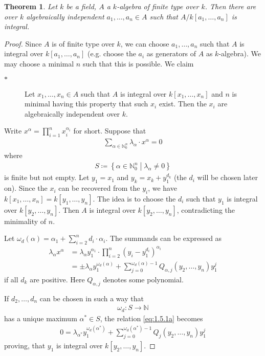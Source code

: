 \documentclass[DIV=14,parskip=half]{scrartcl}
\newtheorem{thm}{Theorem}[subsection]
\theoremstyle{definition}
\newcommand{\N}{\mathbb{N}}
\newcommand{\longto}{\longrightarrow}
\newcommand{\ldotspam}{,\ldots,}
\begin{document}
\begin{thm}\label{thm:NoetherNormalization}
 Let $k$ be a field, $A$ a $k$-algebra of finite type over $k$. Then there are over $k$ algebraically independent $a_1\ldotspam a_n\in A$ such that $A/k[a_1\ldotspam a_n]$ is integral.
\end{thm}
\begin{proof}
 Since $A$ is of finite type over $k$, we can choose $a_1,\ldots, a_n$ such that $A$ is integral over $k[a_1,\ldots, a_n]$ (e.g. choose the $a_i$ as generators of $A$ as $k$-algebra). We may choose a minimal $n$ such that this is possible. We claim 
 \begin{description}
  \item [$\ast$] Let $x_1,\ldots, x_n\in A$ such that $A$ is integral over $k[x_1,\ldots,x_n]$ and $n$ is minimal having this property that such $x_i$ exist. Then the $x_i$ are algebraically independent over $k$.
 \end{description}
Write $x^\alpha = \prod_{i=1}^n x_i^{\alpha_i}$ for short. Suppose that
\begin{align*}
\sum_{\alpha\in\N_0^n} \lambda_\alpha \cdot x^\alpha =0\label{eq:1.5.1a}\tag{\#}
\end{align*}
where 
\begin{align*}
 S\coloneqq \left\{\alpha\in\N_0^n\middle| \lambda_\alpha\neq 0\right\}
\end{align*}
 is finite but not empty. Let $y_1=x_1$ and $y_k = x_k +y_1^{d_k}$ (the $d_i$ will be chosen later on). Since the $x_i$ can be recovered from the $y_i$, we have $k[x_1,\ldots,x_n] = k[y_1,\ldots,y_n]$. The idea is to choose the $d_i$ such that $y_1$ is integral over $k[y_2,\ldots,y_n]$. Then $A$ is integral over $k[y_2,\ldots,y_n]$, contradicting the minimality of $n$. 

Let $\omega_d(\alpha) =\alpha_1 +\sum_{i=2}^nd_i\cdot \alpha_i$. The summands can be expressed as 
\begin{align*}
 \lambda_\alpha x^\alpha &= \lambda_\alpha y_1^{\alpha_1} \cdot\prod_{i=2}^n \left(y_i - y_1^{d_i}\right)^{\alpha_i} \\
 &= \pm \lambda_\alpha y_1^{\omega_d(\alpha)} + \sum_{j=0}^{\omega_d(\alpha)-1} Q_{\alpha,j}(y_2,\ldots, y_n) y_1^j
\end{align*}
if all $d_k$ are positive. Here $Q_{\alpha, j}$ denotes some polynomial. 

If $d_2,\ldots, d_n$ can be chosen in such a way that
\begin{align*}
 \omega_d: S\longto \N
\end{align*}
has a unique maximum $\alpha^\ast \in S$, the relation \ref{eq:1.5.1a} becomes
\begin{align*}
 0 = \lambda_{\alpha^\ast} y_1^{\omega_d(\alpha^\ast)} +\sum_{j=0}^{\omega_d(\alpha^\ast)-1} Q_j(y_2,\ldots,y_n)y_1^j
\end{align*}
proving, that $y_1$ is integral over $k[y_2,\ldots,y_n]$. 


\end{proof}
\end{document}
